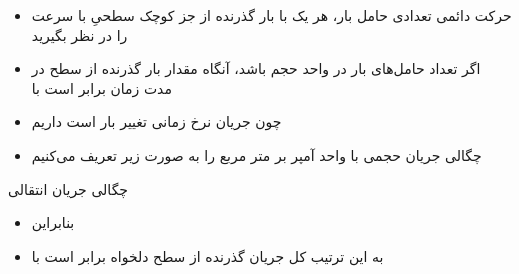 \ELhold


\begin{ELunit}


\begin{itemize}
\tightlist
\item
  حرکت دائمی تعدادی حامل بار، هر یک با بار  گذرنده از جز کوچک سطحیِ  با سرعت  را در نظر بگیرید
\item
  اگر  تعداد حامل‌های بار در واحد حجم باشد، آنگاه مقدار بار گذرنده از سطح  در مدت زمان  برابر است با
\end{itemize}


\begin{itemize}
\tightlist
\item
  چون جریان نرخ زمانی تغییر بار است داریم
\end{itemize}


\begin{itemize}
\tightlist
\item
  چگالی جریان حجمی با واحد آمپر بر متر مربع را به صورت زیر تعریف می‌کنیم
\end{itemize}


\end{ELunit}

\begin{ELimportant}{چگالی جریان انتقالی}


\end{ELimportant}

\begin{ELjoin}

\begin{itemize}
\tightlist
\item
  بنابراین
\end{itemize}


\begin{itemize}
\tightlist
\item
  به این ترتیب کل جریان گذرنده از سطح دلخواه  برابر است با
\end{itemize}

\begin{ELimportant}{}


\end{ELimportant}

\end{ELjoin}

